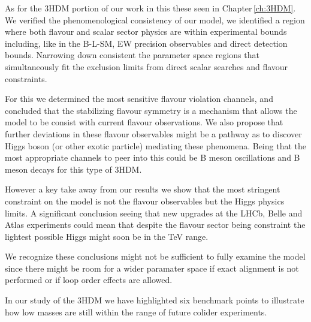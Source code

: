 
As for the 3HDM portion of our work in this these seen in  Chapter\,\ref{ch:3HDM}. 
%
We verified the phenomenological consistency of our model, we identified a region where both flavour and scalar sector physics are within experimental bounds including, like in the B-L-SM, EW precision observables and direct detection bounds.  
%
%
Narrowing down consistent the parameter space regions that simultaneously fit the exclusion limits from direct scalar searches and flavour constraints. 

For this we determined the most sensitive flavour violation channels, and concluded that the stabilizing flavour symmetry is a mechanism that allows the model to be consist with current flavour observations. 
%
We also propose that further deviations in these flavour observables might be a pathway as to discover Higgs boson (or other exotic particle) mediating these phenomena. 
%
Being that the most appropriate channels to peer into this could be B meson oscillations and B meson decays for this type of 3HDM.

However a key take away from our results we show that the most stringent constraint on the model is not the flavour observables but the Higgs physics limits. 
%
A significant conclusion seeing that new upgrades at the LHCb, Belle and Atlas experiments could mean that despite the flavour sector being constraint the lightest possible Higgs might soon be in the TeV range. 

We recognize these conclusions might not be sufficient to fully examine the model since there might be room for a wider paramater space if exact alignment is not performed or if loop order effects are allowed.

In our study of the 3HDM we have highlighted six benchmark points to illustrate how low masses are still within the range of future colider experiments.



